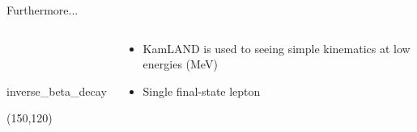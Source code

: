 \documentclass[14pt]{beamer}
\begin{document}
\begin{frame}[fragile]{Furthermore...}
	\centering
	\begin{columns}[T]
		\begin{block}{\\~\\}
			\centering
			\begin{fmffile}{inverse_beta_decay} \begin{fmfgraph*}(150,120)
				 
			\end{fmfgraph*} \end{fmffile}
		\end{block}
		\begin{block}{}
			\begin{itemize}
				\item<2-> KamLAND is used to seeing simple kinematics at low
					energies (\si{\mega\electronvolt})
				\item<3-> Single final-state lepton
			\end{itemize}
		\end{block}
	\end{columns}
\end{frame}
\end{document}
